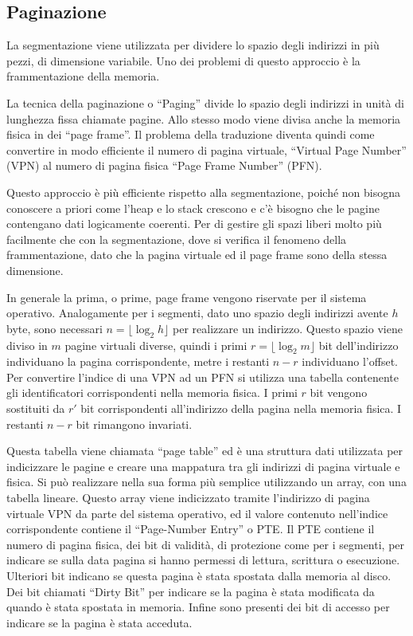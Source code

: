 \documentclass{article}
\numberwithin{equation}{subsection}
\begin{document}



\subsection{Paginazione}

La segmentazione viene utilizzata per dividere lo spazio degli indirizzi in più pezzi, di dimensione variabile. Uno dei problemi di questo approccio è la frammentazione 
della memoria.  

La tecnica della paginazione o ``Paging'' divide lo spazio degli indirizzi in unità di lunghezza fissa chiamate pagine. Allo stesso modo viene divisa anche la 
memoria fisica in dei ``page frame''. Il problema della traduzione diventa quindi come convertire in modo efficiente il numero di pagina virtuale, ``Virtual Page Number'' (VPN) 
al numero di pagina fisica ``Page Frame Number'' (PFN). 

Questo approccio è più efficiente rispetto alla segmentazione, poiché non bisogna conoscere a priori come l'heap e lo stack crescono e c'è bisogno che le pagine 
contengano dati logicamente coerenti. Per di gestire gli spazi liberi molto più facilmente che con la segmentazione, dove si verifica il fenomeno della frammentazione, 
dato che la pagina virtuale ed il page frame sono della stessa dimensione. 

In generale la prima, o prime, page frame vengono riservate per il sistema operativo. Analogamente per i segmenti, dato uno spazio degli indirizzi avente $h$ byte, 
sono necessari $n=\lfloor\log_2{h}\rfloor$ per realizzare un indirizzo. Questo spazio viene diviso in $m$ pagine virtuali diverse, quindi i primi $r=\lfloor\log_2{m}\rfloor$ 
bit dell'indirizzo individuano la pagina corrispondente, metre i restanti $n-r$ individuano l'offset. 
Per convertire l'indice di una VPN ad un PFN si utilizza una tabella contenente gli identificatori corrispondenti nella memoria fisica. I primi $r$ bit vengono sostituiti 
da $r'$ bit corrispondenti all'indirizzo della pagina nella memoria fisica. I restanti $n-r$ bit rimangono invariati. 


Questa tabella viene chiamata ``page table'' ed è una struttura dati utilizzata per indicizzare le pagine e creare una mappatura tra gli indirizzi di pagina virtuale 
e fisica. Si può realizzare nella sua forma più semplice utilizzando un array, con una tabella lineare. Questo array viene indicizzato tramite l'indirizzo di pagina 
virtuale VPN da parte del sistema operativo, ed il valore contenuto nell'indice corrispondente contiene il ``Page-Number Entry'' o PTE. 
Il PTE contiene il numero di pagina fisica, dei bit di validità, di protezione come per i segmenti, per indicare se sulla data pagina si hanno permessi di lettura, 
scrittura o esecuzione. Ulteriori bit indicano se questa pagina è stata spostata dalla memoria al disco. Dei bit chiamati ``Dirty Bit'' per indicare se la pagina è stata 
modificata da quando è stata spostata in memoria. Infine sono presenti dei bit di accesso per indicare se la pagina è stata acceduta. 
\end{document}
